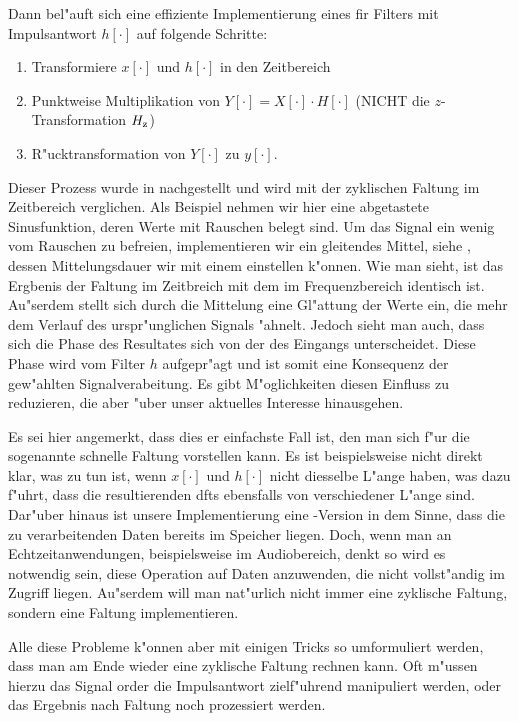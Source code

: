 Dann bel"auft sich eine effiziente Implementierung eines \gls{fir} Filters mit Impulsantwort $h[\cdot]$ auf folgende Schritte:
\begin{enumerate}
    \item Transformiere $x[\cdot]$ und $h[\cdot]$ in den Zeitbereich
    \item Punktweise Multiplikation von $Y[\cdot] = X[\cdot] \cdot H[\cdot]$ (NICHT die $z$-Transformation $H_{{\rm z}}$)
    \item R"ucktransformation von $Y[\cdot]$ zu $y[\cdot]$.
\end{enumerate}
%
Dieser Prozess wurde in  nachgestellt und wird mit der zyklischen Faltung im Zeitbereich verglichen.
Als Beispiel nehmen wir hier eine abgetastete Sinusfunktion, deren Werte mit Rauschen belegt sind.
Um das Signal ein wenig vom Rauschen zu befreien, implementieren wir ein gleitendes Mittel, siehe , dessen Mittelungsdauer wir mit einem  einstellen k"onnen.
Wie man sieht, ist das Ergbenis der Faltung im Zeitbreich mit dem im Frequenzbereich identisch ist.
Au"serdem stellt sich durch die Mittelung eine Gl"attung der Werte ein, die mehr dem Verlauf des urspr"unglichen Signals "ahnelt.
Jedoch sieht man auch, dass sich die Phase des Resultates sich von der des Eingangs unterscheidet.
Diese Phase wird vom Filter $h$ aufgepr"agt und ist somit eine Konsequenz der gew"ahlten Signalverabeitung.
Es gibt M"oglichkeiten diesen Einfluss zu reduzieren, die aber "uber unser aktuelles Interesse hinausgehen.

Es sei hier angemerkt, dass dies er einfachste Fall ist, den man sich f"ur die sogenannte schnelle Faltung vorstellen kann.
Es ist beispielsweise nicht direkt klar, was zu tun ist, wenn $x[\cdot]$ und $h[\cdot]$ nicht diesselbe L"ange haben, was dazu f"uhrt, dass die resultierenden \glspl{dft} ebensfalls von verschiedener L"ange sind.
Dar"uber hinaus ist unsere Implementierung eine -Version in dem Sinne, dass die zu verarbeitenden Daten bereits im Speicher liegen.
Doch, wenn man an Echtzeitanwendungen, beispielsweise im Audiobereich, denkt so wird es notwendig sein, diese Operation auf Daten anzuwenden, die nicht vollst"andig im Zugriff liegen.
Au"serdem will man nat"urlich nicht immer eine zyklische Faltung, sondern eine  Faltung implementieren.

Alle diese Probleme k"onnen aber mit einigen Tricks so umformuliert werden, dass man am Ende wieder eine zyklische Faltung rechnen kann.
Oft m"ussen hierzu das Signal order die Impulsantwort zielf"uhrend manipuliert werden, oder das Ergebnis nach Faltung noch prozessiert werden.

